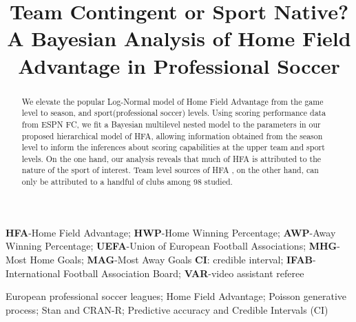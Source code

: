 \documentclass[]{interact}
\theoremstyle{plain}%
\theoremstyle{definition}
\theoremstyle{remark}
\begin{document}

\title{Team Contingent or Sport Native? A Bayesian Analysis of Home Field Advantage in Professional Soccer}




\maketitle

\begin{abstract}
We elevate the popular Log-Normal model of Home Field Advantage from the game level to season, and sport(professional soccer) levels. Using scoring performance data from ESPN FC, we fit a Bayesian multilevel nested model to the parameters in our proposed hierarchical model of HFA, allowing information obtained from the season level to inform the inferences about scoring capabilities at the upper team and sport levels. On the one hand, our analysis reveals that much of HFA is attributed to the nature of the sport of interest. Team level sources of HFA , on the other hand, can only be attributed to a handful of clubs among 98 studied. 
\end{abstract}
\begin{abbreviations}
	\textbf{HFA}-Home Field Advantage; \textbf{HWP}-Home Winning Percentage; 
\textbf{AWP}-Away Winning Percentage; \textbf{UEFA}-Union of European Football Associations; \textbf{MHG}-Most Home Goals; \textbf{MAG}-Most Away Goals
\textbf{CI}: credible interval; \textbf{IFAB}-International Football Association Board; \textbf{VAR}-video assistant referee 
\end{abbreviations}  
\begin{keywords}
	European professional soccer leagues; Home Field Advantage; Poisson generative process; Stan and CRAN-R; Predictive accuracy and Credible Intervals (CI)
\end{keywords}
\end{document}
